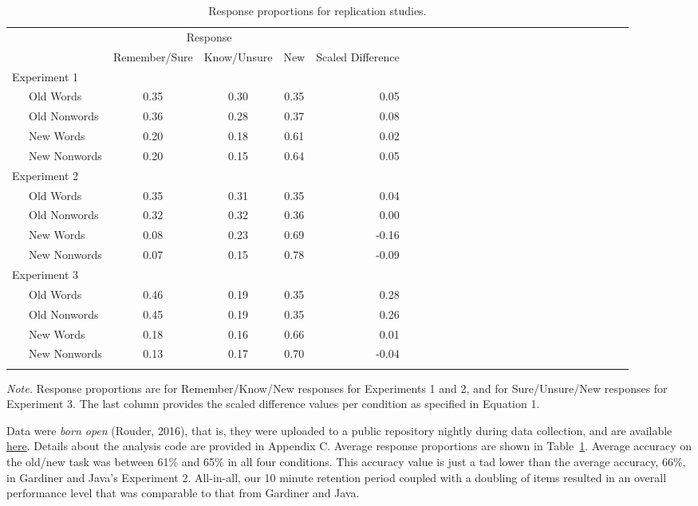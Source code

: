 \documentclass[english,,man]{apa6}
\begin{document}
\begin{table}[tbp]
\begin{center}
\begin{threeparttable}
\caption{\label{tab:tab-results}Response proportions for replication studies.}
\begin{tabular}{lcccrlcccrlcccrlcccrlcccr}
\toprule
 & \multicolumn{3}{c}{Response}  &\\
\cmidrule(r){2-4}
  & \multicolumn{1}{c}{Remember/Sure} & \multicolumn{1}{c}{Know/Unsure} & \multicolumn{1}{c}{New} & \multicolumn{1}{c}{Scaled Difference}\\
\midrule
Experiment 1 &  &  &  & \\
\ \ \ Old Words & 0.35 & 0.30 & 0.35 & 0.05\\
\ \ \ Old Nonwords & 0.36 & 0.28 & 0.37 & 0.08\\
\ \ \ New Words & 0.20 & 0.18 & 0.61 & 0.02\\
\ \ \ New Nonwords & 0.20 & 0.15 & 0.64 & 0.05\\
Experiment 2 &  &  &  & \\
\ \ \ Old Words & 0.35 & 0.31 & 0.35 & 0.04\\
\ \ \ Old Nonwords & 0.32 & 0.32 & 0.36 & 0.00\\
\ \ \ New Words & 0.08 & 0.23 & 0.69 & -0.16\\
\ \ \ New Nonwords & 0.07 & 0.15 & 0.78 & -0.09\\
Experiment 3 &  &  &  & \\
\ \ \ Old Words & 0.46 & 0.19 & 0.35 & 0.28\\
\ \ \ Old Nonwords & 0.45 & 0.19 & 0.35 & 0.26\\
\ \ \ New Words & 0.18 & 0.16 & 0.66 & 0.01\\
\ \ \ New Nonwords & 0.13 & 0.17 & 0.70 & -0.04\\
\bottomrule
\addlinespace
\end{tabular}
\begin{tablenotes}[para]
\normalsize{\textit{Note.} Response proportions are for Remember/Know/New responses for Experiments 1 and 2, and for Sure/Unsure/New responses for Experiment 3. The last column provides the scaled difference values per condition as specified in Equation 1.}
\end{tablenotes}
\end{threeparttable}
\end{center}
\end{table}

Data were \emph{born open} (Rouder, 2016), that is, they were uploaded to a public repository nightly during data collection, and are available \href{https://github.com/PerceptionCognitionLab/data1/tree/master/repGardinerJava/RKN_replication/RKN_exp1}{here}. Details about the analysis code are provided in Appendix C. Average response proportions are shown in Table~\ref{tab:tab-results}. Average accuracy on the old/new task was between 61\% and 65\% in all four conditions. This accuracy value is just a tad lower than the average accuracy, 66\%, in Gardiner and Java's Experiment 2. All-in-all, our 10 minute retention period coupled with a doubling of items resulted in an overall performance level that was comparable to that from Gardiner and Java.
\end{document}
